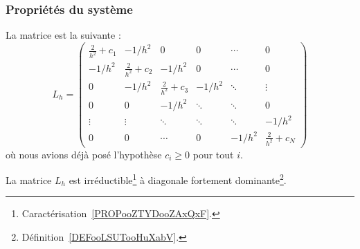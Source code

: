 

\subsubsection{Propriétés du système}

La matrice est la suivante :
\begin{equation}
    L_h=\begin{pmatrix}
        \frac{ 2 }{ h^2 }+c_1 & -1/h^2                & 0                     & 0      & \cdots & 0                     \\
        -1/h^2                & \frac{ 2 }{ h^2 }+c_2 & -1/h^2                & 0      & \cdots & 0                     \\
        0                     & -1/h^2                & \frac{ 2 }{ h^2 }+c_3 & -1/h^2 & \ddots & \vdots                \\
        0                     & 0                     & -1/h^2                & \ddots & \ddots & 0                     \\
        \vdots                & \vdots                & \ddots                & \ddots & \ddots & -1/h^2                \\
        0                     & 0                     & \cdots                & 0      & -1/h^2 & \frac{ 2 }{ h^2 }+c_N
    \end{pmatrix}
\end{equation}
où nous avions déjà posé l'hypothèse \( c_i\geq 0\) pour tout \( i\).

\begin{lemma}       \label{LEMooGGHQooNnVsuu}
    La matrice \( L_h\) est irréductible\footnote{Caractérisation~\ref{PROPooZTYDooZAxQxF}.} à diagonale fortement dominante\footnote{Définition~\ref{DEFooLSUTooHuXabV}.}.
\end{lemma}

